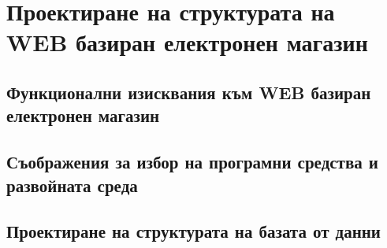 \chapter{Проектиране на структурата на WEB базиран електронен магазин}

\section{Функционални изисквания към WEB базиран електронен магазин}

\section{Съображения за избор на програмни средства и развойната среда}

\section{Проектиране на структурата на базата от данни}
